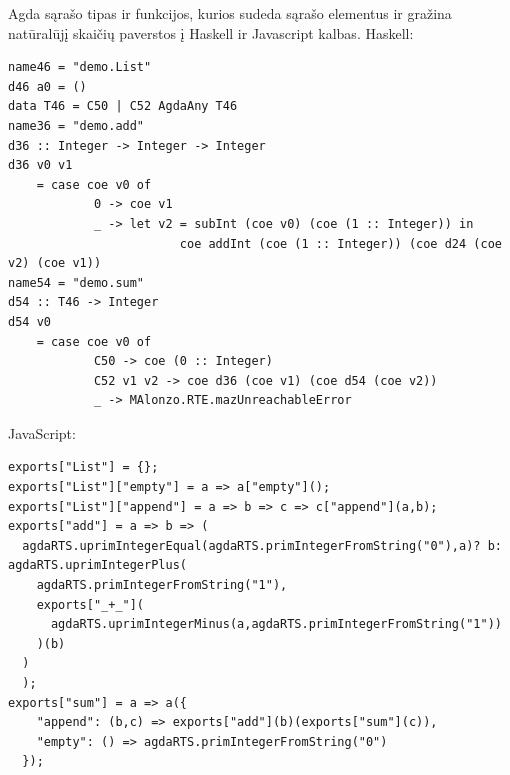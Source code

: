 \documentclass{VUMIFPSkursinis}
\begin{document}
\label{sec:priedas1}
Agda sąrašo tipas ir funkcijos, kurios sudeda sąrašo elementus ir gražina natūralūjį skaičių paverstos į Haskell ir Javascript kalbas. \newline
Haskell:
\begin{lstlisting}
name46 = "demo.List"
d46 a0 = ()
data T46 = C50 | C52 AgdaAny T46	
name36 = "demo.add"
d36 :: Integer -> Integer -> Integer
d36 v0 v1
	= case coe v0 of
			0 -> coe v1
			_ -> let v2 = subInt (coe v0) (coe (1 :: Integer)) in
						coe addInt (coe (1 :: Integer)) (coe d24 (coe v2) (coe v1))
name54 = "demo.sum"
d54 :: T46 -> Integer
d54 v0
	= case coe v0 of
			C50 -> coe (0 :: Integer)
			C52 v1 v2 -> coe d36 (coe v1) (coe d54 (coe v2))
			_ -> MAlonzo.RTE.mazUnreachableError
	\end{lstlisting}
JavaScript:
\begin{lstlisting}
exports["List"] = {};
exports["List"]["empty"] = a => a["empty"]();
exports["List"]["append"] = a => b => c => c["append"](a,b);
exports["add"] = a => b => (
  agdaRTS.uprimIntegerEqual(agdaRTS.primIntegerFromString("0"),a)? b: agdaRTS.uprimIntegerPlus(
    agdaRTS.primIntegerFromString("1"),
    exports["_+_"](
      agdaRTS.uprimIntegerMinus(a,agdaRTS.primIntegerFromString("1"))
    )(b)
  )
  );
exports["sum"] = a => a({
    "append": (b,c) => exports["add"](b)(exports["sum"](c)),
    "empty": () => agdaRTS.primIntegerFromString("0")
  });
	\end{lstlisting}
\end{document}
